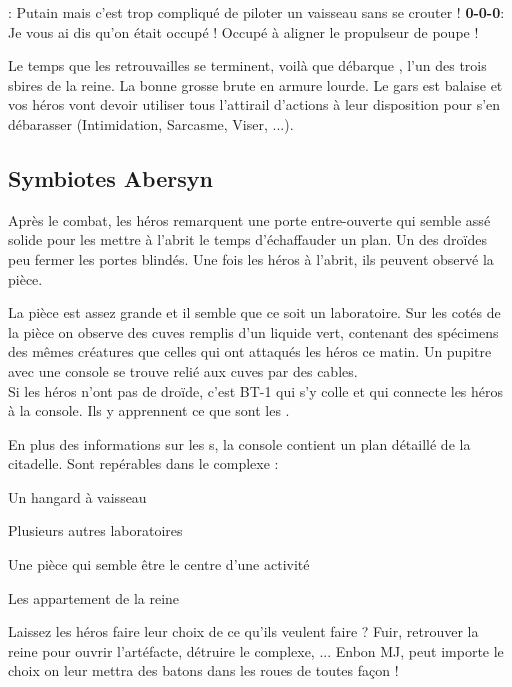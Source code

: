 \begin{quotebox}
\noindent\textbf{}: Putain mais c’est trop compliqué de piloter un vaisseau sans se crouter !
\noindent\textbf{0-0-0}: Je vous ai dis qu’on était occupé ! Occupé à aligner le propulseur de poupe !
\end{quotebox}

Le temps que les retrouvailles se terminent, voilà que débarque , l’un des trois sbires de la reine. La bonne grosse brute en armure lourde. Le gars est balaise et vos héros vont devoir utiliser tous l’attirail d’actions à leur disposition pour s’en débarasser (Intimidation, Sarcasme, Viser, ...).

\subsection{Symbiotes Abersyn}

Après le combat, les héros remarquent une porte entre-ouverte qui semble assé solide pour les mettre à l’abrit le temps d’échaffauder un plan. Un des droïdes peu fermer les portes blindés. Une fois les héros à l’abrit, ils peuvent observé la pièce. 

La pièce est assez grande et il semble que ce soit un laboratoire. Sur les cotés de la pièce on observe des cuves remplis d’un liquide vert, contenant des spécimens des mêmes créatures que celles qui ont attaqués les héros ce matin. Un pupitre avec une console se trouve relié aux cuves par des cables. \\

Si les héros n’ont pas de droïde, c’est BT-1 qui s’y colle et qui connecte les héros à la console. Ils y apprennent ce que sont les .

En plus des informations sur les s, la console contient un plan détaillé de la citadelle. Sont repérables dans le complexe :

\begin{rebelist}
	\item Un hangard à vaisseau
	\item Plusieurs autres laboratoires
	\item Une pièce qui semble être le centre d’une activité
    \item Les appartement de la reine
\end{rebelist}

Laissez les héros faire leur choix de ce qu’ils veulent faire ? Fuir, retrouver la reine pour ouvrir l’artéfacte, détruire le complexe, ... Enbon MJ, peut importe le choix on leur mettra des batons dans les roues de toutes façon !